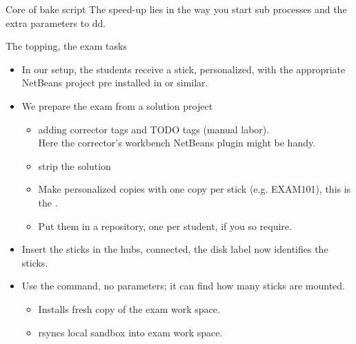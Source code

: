 \begin{frame}{Core of bake script}
The speed-up lies in the way you start  sub processes and the extra
parameters to dd.

\end{frame}

\begin{frame}{The topping, the exam tasks}
  \begin{itemize}
  \item In our setup, the students receive a stick, personalized, with
    the appropriate NetBeans project pre installed in
     or similar.
  \item We prepare the exam from a solution project
    \begin{itemize}
    \item adding corrector tags and TODO tags (manual labor).\\
      Here the corrector's workbench NetBeans plugin might be handy.
    \item strip the solution
    \item Make personalized copies with one copy per stick
      (e.g. EXAM101), this is the .
    \item Put them in a repository, one per student, if you so require.
    \end{itemize}

  \item Insert the sticks in the hubs, connected, the disk label now identifies the sticks.
  \item Use the  command, no parameters; it can find
    how many sticks are mounted.
    \begin{itemize}
    \item Installs fresh copy of the exam work space.
    \item rsyncs local sandbox into exam work space.
    \end{itemize}
  \end{itemize}
\end{frame}

